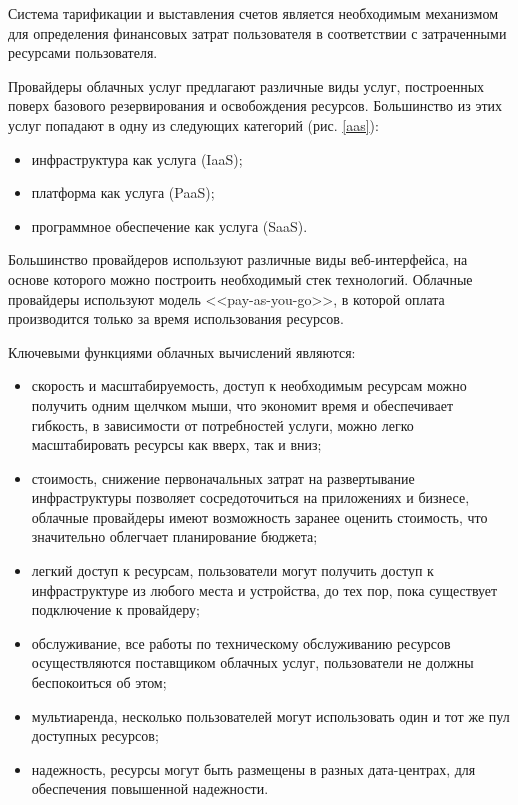 Система тарификации и выставления счетов является необходимым механизмом для определения финансовых затрат пользователя в соответствии с затраченными ресурсами пользователя.

Провайдеры облачных услуг предлагают различные виды услуг, построенных поверх базового резервирования и освобождения ресурсов.
Большинство из этих услуг попадают в одну из следующих категорий (рис. \ref{aas}):
\begin{itemize}
  \item инфраструктура как услуга (IaaS);
  \item платформа как услуга (PaaS);
  \item программное обеспечение как услуга (SaaS).
\end{itemize}


Большинство провайдеров используют различные виды веб-интерфейса, на основе которого можно построить необходимый стек технологий.
Облачные провайдеры используют модель <<pay-as-you-go>>, в которой оплата производится только за время использования ресурсов.

Ключевыми функциями облачных вычислений являются:
\begin{itemize}
  \item скорость и масштабируемость, доступ к необходимым ресурсам можно получить одним щелчком мыши, что экономит время и обеспечивает гибкость, в зависимости от потребностей услуги, можно легко масштабировать ресурсы как вверх, так и вниз;
  \item стоимость, снижение первоначальных затрат на развертывание инфраструктуры позволяет сосредоточиться на приложениях и бизнесе, облачные провайдеры имеют возможность заранее оценить стоимость, что значительно облегчает планирование бюджета;
  \item легкий доступ к ресурсам, пользователи могут получить доступ к инфраструктуре из любого места и устройства, до тех пор, пока существует подключение к провайдеру;
  \item обслуживание, все работы по техническому обслуживанию ресурсов осуществляются поставщиком облачных услуг, пользователи не должны беспокоиться об этом;
  \item мультиаренда, несколько пользователей могут использовать один и тот же пул доступных ресурсов;
  \item надежность, ресурсы могут быть размещены в разных дата-центрах, для обеспечения повышенной надежности.
\end{itemize}

